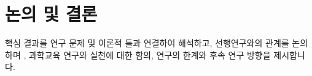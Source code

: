 \section{논의 및 결론}\label{sec:discussion-kr}


핵심 결과를 연구 문제 및 이론적 틀과 연결하여 해석하고, 선행연구와의 관계를
논의하며 \citep{examplechapter2019}, 과학교육 연구와 실천에 대한 함의, 연구의
한계와 후속 연구 방향을 제시합니다.
